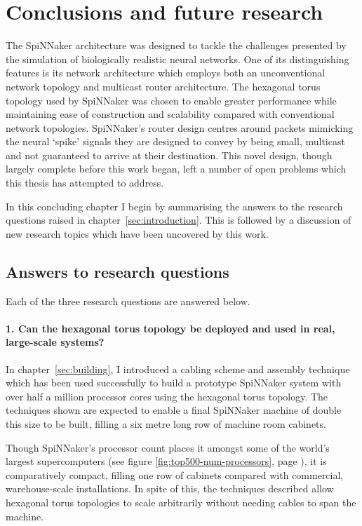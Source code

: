 \chapter{Conclusions and future research}
	
	The SpiNNaker architecture was designed to tackle the challenges presented by
	the simulation of biologically realistic neural networks. One of its
	distinguishing features is its network architecture which employs both an
	unconventional network topology and multicast router architecture. The
	hexagonal torus topology used by SpiNNaker was chosen to enable greater
	performance while maintaining ease of construction and scalability compared
	with conventional network topologies. SpiNNaker's router design centres
	around packets mimicking the neural `spike' signals they are designed to
	convey by being small, multicast and not guaranteed to arrive at their
	destination.  This novel design, though largely complete before this work
	began, left a number of open problems which this thesis has attempted to
	address.
	
	In this concluding chapter I begin by summarising the answers to the research
	questions raised in chapter~\ref{sec:introduction}. This is followed by a
	discussion of new research topics which have been uncovered by this work.
	
	\section{Answers to research questions}
		
		Each of the three research questions are answered below.
		
		\subsubsection{1. Can the hexagonal torus topology be deployed and used in
		real, large-scale systems?}
		
		In chapter~\ref{sec:building}, I introduced a cabling scheme and assembly
		technique which has been used successfully to build a prototype SpiNNaker
		system with over half a million processor cores using the hexagonal torus
		topology. The techniques shown are expected to enable a final SpiNNaker
		machine of double this size to be built, filling a six metre long row of
		machine room cabinets.
		
		Though SpiNNaker's processor count places it amongst some of the world's
		largest supercomputers (see figure \ref{fig:top500-num-processors}, page
		\pageref{fig:top500-num-processors}), it is comparatively compact, filling
		one row of cabinets compared with commercial, warehouse-scale
		installations. In spite of this, the techniques described allow hexagonal
		torus topologies to scale arbitrarily without needing cables to span the
		machine.
		
